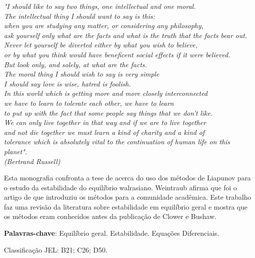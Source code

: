 \documentclass[
	12pt,				%
	openright,			%
	twoside,			%
	a4paper,			%
	english,			%
	french,				%
	spanish,			%
	brazil				%
	]{abntex2}
\begin{document}
\begin{epigrafe}
    \vspace*{\fill}
	\begin{flushright}
		\textit{"I should like to say two things, one intellectual and one moral. \\
						The intellectual thing I should want to say is this: \\
						when you are studying any matter, or considering any philosophy, \\
						ask yourself only what are the facts and what is the truth that the facts bear out.\\
						Never let yourself be diverted either by what you wish to believe, \\
						or by what you think would have beneficent social effects if it were believed. \\
						But look only, and solely, at what are the facts. \\
						The moral thing I should wish to say is very simple \\
						I should say love is wise, hatred is foolish.\\
						In this world which is getting more and more closely interconnected \\
						we have to learn to tolerate each other, we have to learn \\
						to put up with the fact that some people say things that we don't like. \\
						We can only live together in that way and if we are to live together \\
						and not die together we must learn a kind of charity and a kind of \\
						tolerance which is absolutely vital to the continuation of human life on this planet".\\
						(Bertrand Russell)}
	\end{flushright}
\end{epigrafe}


\setlength{\absparsep}{18pt} %
\begin{resumo}

Esta monografia confronta a tese de  acerca do uso dos métodos
de Liapunov para o estudo da estabilidade do equilíbrio walrasiano.
Weintraub afirma que foi o artigo de 
que introduziu os métodos para a comunidade acadêmica. Este trabalho
faz uma revisão da literatura sobre estabilidade em equilíbrio geral e mostra que
os métodos eram conhecidos antes da publicação de Clower e Bushaw.

 \textbf{Palavras-chave}: Equilíbrio geral. Estabilidade. Equações Diferenciais.

 Classificação JEL: B21; C26; D50.
\end{resumo}
\end{document}
